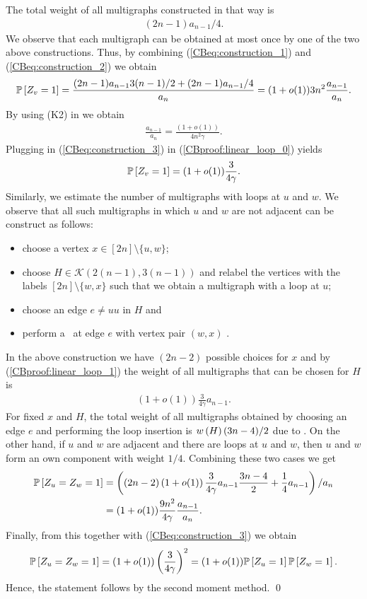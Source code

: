 The total weight of all multigraphs constructed in that way is
\begin{align}\label{CBeq:construction_2}
(2n-1)a_{n-1}/4.
\end{align}
We observe that each multigraph can be obtained at most once by one of the two above constructions. Thus, by combining (\ref{CBeq:construction_1}) and (\ref{CBeq:construction_2}) we obtain
\begin{align}\label{CBproof:linear_loop_0}
\mathbb{P}\left[Z_v=1\right]=\frac{(2n-1)a_{n-1}3(n-1)/2+(2n-1)a_{n-1}/4}{a_n}=(1+o(1))3n^2\frac{a_{n-1}}{a_n}.
\end{align}
By using (K2) in  we obtain 
\begin{align}\label{CBeq:construction_3}
\frac{a_{n-1}}{a_n}=\frac{\left(1+o(1)\right)}{4n^2\gamma}.
\end{align}
Plugging in (\ref{CBeq:construction_3}) in (\ref{CBproof:linear_loop_0}) yields 
\begin{align}\label{CBproof:linear_loop_1}
\mathbb{P}\left[Z_v=1\right]=(1+o(1))\frac{3}{4\gamma}.
\end{align}
Similarly, we estimate the number of multigraphs with loops at $u$ and $w$. We observe that all such multigraphs in which $u$ and $w$ are not adjacent can be construct as follows:
\begin{itemize}
	\item choose a vertex $x \in [2n]\setminus\{u, w\}$;
	\item choose $H \in \mathcal{K}(2(n-1), 3(n-1))$ and relabel the vertices with the labels $[2n]\setminus \{w, x\}$ such that we obtain a multigraph with a loop at $u$;
	\item
	choose an edge $e \neq uu$ in $H$ and 
	\item[]
	perform a \loopInsertion\ at edge $e$ with vertex pair $(w,x)$ .
\end{itemize}
In the above construction we have $(2n-2)$ possible choices for $x$ and by (\ref{CBproof:linear_loop_1}) the weight of all multigraphs that can be chosen for $H$ is
\begin{align*}
\left(1+o(1)\right)\frac{3}{4\gamma}a_{n-1}.
\end{align*} 
For fixed $x$ and $H$, the total weight of all multigraphs obtained by choosing an edge $e$ and performing the loop insertion is $w\left(H\right)(3n-4)/2$ due to . 
On the other hand, if $u$ and $w$ are adjacent and there are loops at $u$ and $w$, then $u$ and $w$ form an own component with weight $1/4$. Combining these two cases we get 
\begin{align*}
\mathbb{P}\left[Z_u=Z_w=1\right]&=\left((2n-2)\left(1+o(1)\right)\frac{3}{4\gamma}a_{n-1}\frac{3n-4}{2}+\frac{1}{4}a_{n-1}\right)/a_n
\\
&=(1+o(1))\frac{9n^2}{4\gamma}\frac{a_{n-1}}{a_n}.
\end{align*}
Finally, from this together with (\ref{CBeq:construction_3}) we obtain 
\begin{align*}
\mathbb{P}\left[Z_u=Z_w=1\right]
= (1+o(1))\left(\frac{3}{4\gamma}\right)^2
=(1+o(1))\mathbb{P}\left[Z_u=1\right]\mathbb{P}\left[Z_w=1\right].
\end{align*}
Hence, the statement follows by the second moment method. \qed


